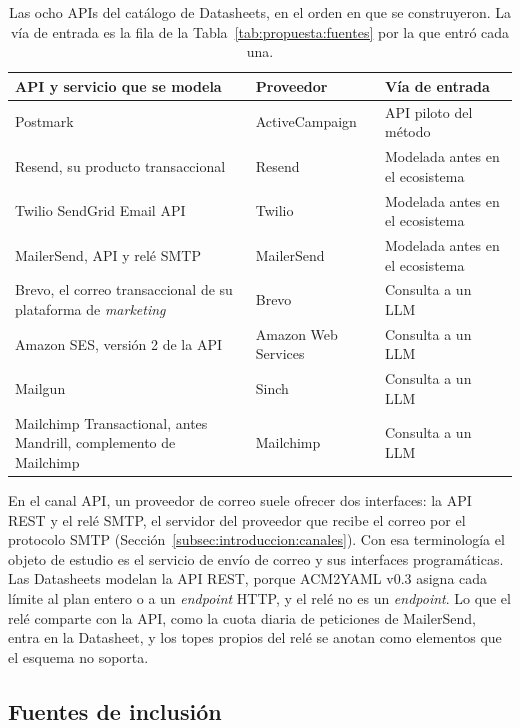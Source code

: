 \begin{table}[htbp]\centering\small
\begin{tabular}{|p{7.4cm}|p{2.9cm}|p{3.8cm}|}
\hline
\raggedright\textbf{API y servicio que se modela} & \raggedright\textbf{Proveedor} & \raggedright\textbf{Vía de entrada} \tabularnewline
\hline
\raggedright Postmark & \raggedright ActiveCampaign & \raggedright API piloto del método \tabularnewline
\hline
\raggedright Resend, su producto transaccional & \raggedright Resend & \raggedright Modelada antes en el ecosistema \tabularnewline
\hline
\raggedright Twilio SendGrid Email API & \raggedright Twilio & \raggedright Modelada antes en el ecosistema \tabularnewline
\hline
\raggedright MailerSend, API y relé SMTP & \raggedright MailerSend & \raggedright Modelada antes en el ecosistema \tabularnewline
\hline
\raggedright Brevo, el correo transaccional de su plataforma de \textit{marketing} & \raggedright Brevo & \raggedright Consulta a un LLM \tabularnewline
\hline
\raggedright Amazon SES, versión 2 de la API & \raggedright Amazon Web Services & \raggedright Consulta a un LLM \tabularnewline
\hline
\raggedright Mailgun & \raggedright Sinch & \raggedright Consulta a un LLM \tabularnewline
\hline
\raggedright Mailchimp Transactional, antes Mandrill, complemento de Mailchimp & \raggedright Mailchimp & \raggedright Consulta a un LLM \tabularnewline
\hline\end{tabular}
\caption[Las ocho APIs del catálogo de Datasheets]{Las ocho APIs del catálogo de Datasheets, en el orden en que se construyeron. La vía de entrada es la fila de la Tabla~\ref{tab:propuesta:fuentes} por la que entró cada una.}
\label{tab:propuesta:apis}\end{table}

En el canal API, un proveedor de correo suele ofrecer dos interfaces: la API REST y el relé SMTP, el servidor del proveedor que recibe el correo por el protocolo SMTP (Sección~\ref{subsec:introduccion:canales}).
Con esa terminología el objeto de estudio es el servicio de envío de correo y sus interfaces programáticas.
Las Datasheets modelan la API REST, porque ACM2YAML v0.3 asigna cada límite al plan entero o a un \textit{endpoint} HTTP, y el relé no es un \textit{endpoint}.
Lo que el relé comparte con la API, como la cuota diaria de peticiones de MailerSend, entra en la Datasheet, y los topes propios del relé se anotan como elementos que el esquema no soporta.

\subsection{Fuentes de inclusión}
\label{sec:propuesta:fuentes}

